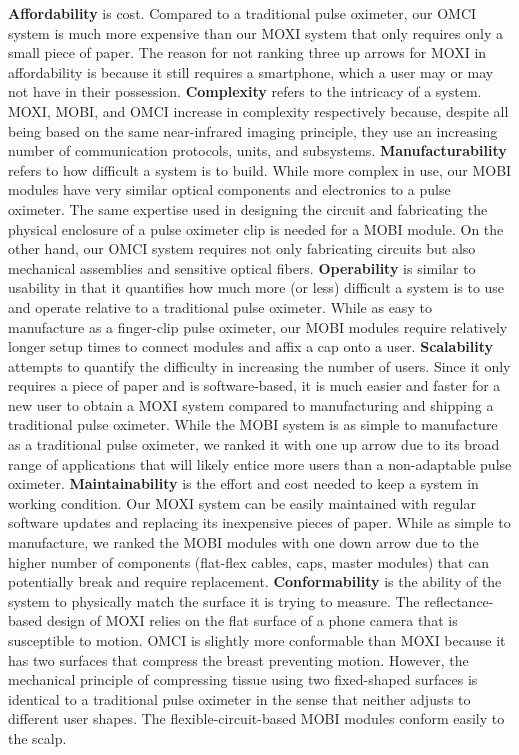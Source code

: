 \textbf{Affordability} is cost. Compared to a traditional pulse oximeter, our \ac{OMCI} system is much more expensive than our \ac{MOXI} system that only requires only a small piece of paper. The reason for not ranking three up arrows for \ac{MOXI} in affordability is because it still requires a smartphone, which a user may or may not have in their possession. \textbf{Complexity} refers to the intricacy of a system. \ac{MOXI}, \ac{MOBI}, and \ac{OMCI} increase in complexity respectively because, despite all being based on the same near-infrared imaging principle, they use an increasing number of communication protocols, units, and subsystems. 
\textbf{Manufacturability} refers to how difficult a system is to build. While more complex in use, our \ac{MOBI} modules have very similar optical components and electronics to a pulse oximeter. The same expertise used in designing the circuit and fabricating the physical enclosure of a pulse oximeter clip is needed for a \ac{MOBI} module. On the other hand, our \ac{OMCI} system requires not only fabricating circuits but also mechanical assemblies and sensitive optical fibers. 
\textbf{Operability} is similar to usability in that it quantifies how much more (or less) difficult a system is to use and operate relative to a traditional pulse oximeter. While as easy to manufacture as a finger-clip pulse oximeter, our \ac{MOBI} modules require relatively longer setup times to connect modules and affix a cap onto a user. 
\textbf{Scalability} attempts to quantify the difficulty in increasing the number of users. Since it only requires a piece of paper and is software-based, it is much easier and faster for a new user to obtain a \ac{MOXI} system compared to manufacturing and shipping a traditional pulse oximeter.  While the \ac{MOBI} system is as simple to manufacture as a traditional pulse oximeter, we ranked it with one up arrow due to its broad range of applications that will likely entice more users than a non-adaptable pulse oximeter. 
\textbf{Maintainability} is the effort and cost needed to keep a system in working condition. Our \ac{MOXI} system can be easily maintained with regular software updates and replacing its inexpensive pieces of paper. While as simple to manufacture, we ranked the \ac{MOBI} modules with one down arrow due to the higher number of components (flat-flex cables, caps, master modules) that can potentially break and require replacement. 
\textbf{Conformability} is the ability of the system to physically match the surface it is trying to measure. The reflectance-based design of \ac{MOXI} relies on the flat surface of a phone camera that is susceptible to motion. \ac{OMCI} is slightly more conformable than \ac{MOXI} because it has two surfaces that compress the breast preventing motion. However, the mechanical principle of compressing tissue using two fixed-shaped surfaces is identical to a traditional pulse oximeter in the sense that neither adjusts to different user shapes. The flexible-circuit-based \ac{MOBI} modules conform easily to the scalp. 
